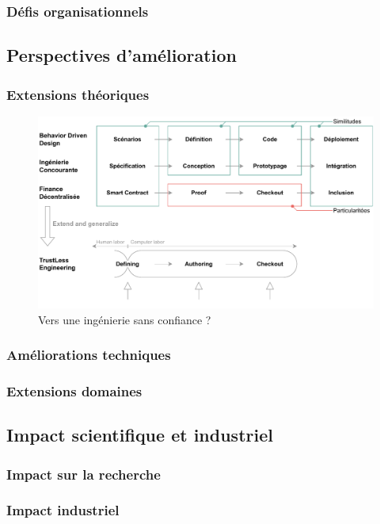\documentclass[a4paper,12pt]{article}
\begin{document}
\subsubsection{Défis organisationnels}
\label{sec:org444bc0e}
\subsection{Perspectives d'amélioration}
\label{sec:org31ca536}
\subsubsection{Extensions théoriques}
\label{sec:org4a9d0a3}

\begin{figure}[htbp]
\centering
\includegraphics[width=.9\linewidth]{./svg/long-term-goal.pdf}
\caption{\label{fig:org2062017}Vers une ingénierie sans confiance ?}
\end{figure}
\subsubsection{Améliorations techniques}
\label{sec:org25e656a}
\subsubsection{Extensions domaines}
\label{sec:orgdc2f9ab}
\subsection{Impact scientifique et industriel}
\label{sec:orgd16afd5}
\subsubsection{Impact sur la recherche}
\label{sec:org540cc44}
\subsubsection{Impact industriel}
\label{sec:orgef78cf7}
\end{document}
